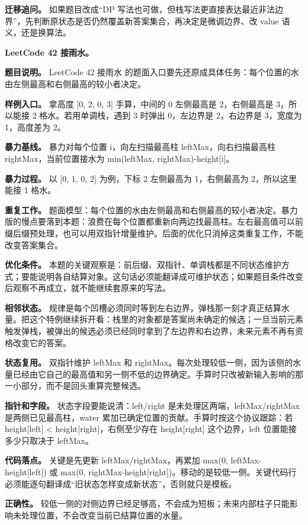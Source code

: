 \textbf{迁移追问。} 如果题目改成“DP 写法也可做，但栈写法更直接表达最近非法边界”，先判断原状态是否仍然覆盖新答案集合，再决定是微调边界、改 value 语义，还是换算法。

\noindent\textbf{LeetCode 42 接雨水。}

\textbf{题目说明。} LeetCode 42 接雨水 的题面入口要先还原成具体任务：每个位置的水由左侧最高和右侧最高的较小者决定。

\textbf{样例入口。} 拿高度 [0, 2, 0, 3] 手算，中间的 0 左侧最高是 2，右侧最高是 3，所以能接 2 格水。若用单调栈，遇到 3 时弹出 0，左边界是 2，右边界是 3，宽度为 1，高度差为 2。

\textbf{暴力基线。} 暴力对每个位置 i，向左扫描最高柱 leftMax，向右扫描最高柱 rightMax，当前位置接水为 min(leftMax, rightMax)-height[i]。

\textbf{暴力过程。} 以 [0, 1, 0, 2] 为例，下标 2 左侧最高为 1，右侧最高为 2，所以这里能接 1 格水。

\textbf{重复工作。} 题面模型：每个位置的水由左侧最高和右侧最高的较小者决定。暴力版的慢点要落到本题：浪费在每个位置都重新向两边找最高柱。左右最高值可以前缀后缀预处理，也可以用双指针增量维护。后面的优化只消掉这类重复工作，不能改变答案集合。

\textbf{优化条件。} 本题的关键观察是：前后缀、双指针、单调栈都是不同状态维护方式；要能说明各自结算对象。这句话必须能翻译成可维护状态；如果题目条件改变后观察不再成立，就不能继续套原来的写法。

\textbf{相邻状态。} 规律是每个凹槽必须同时等到左右边界，弹栈那一刻才真正结算水量。把这个特例继续拆开看：栈里的对象都是答案尚未确定的候选；一旦当前元素触发弹栈，被弹出的候选必须已经同时拿到了左边界和右边界，未来元素不再有资格改变它的答案。

\textbf{状态复用。} 双指针维护 leftMax 和 rightMax。每次处理较低一侧，因为该侧的水量已经由它自己的最高值和另一侧不低的边界确定。手算时只改被新输入影响的那一小部分，而不是回头重算完整候选。

\textbf{指针和字段。} 状态字段要能说清：left/right 是未处理区两端，leftMax/rightMax 是两侧已见最高柱，water 累加已确定位置的贡献。手算时按这个协议跟踪：若 height[left] < height[right]，右侧至少存在 height[right] 这个边界，left 位置能接多少只取决于 leftMax。

\textbf{代码落点。} 关键是先更新 leftMax/rightMax，再累加 max(0, leftMax-height[left]) 或 max(0, rightMax-height[right])。移动的是较低一侧。关键代码行必须能逐句翻译成“旧状态怎样变成新状态”，否则就只是模板。

\textbf{正确性。} 较低一侧的对侧边界已经足够高，不会成为短板；未来内部柱子只能影响未处理位置，不会改变当前已结算位置的水量。

